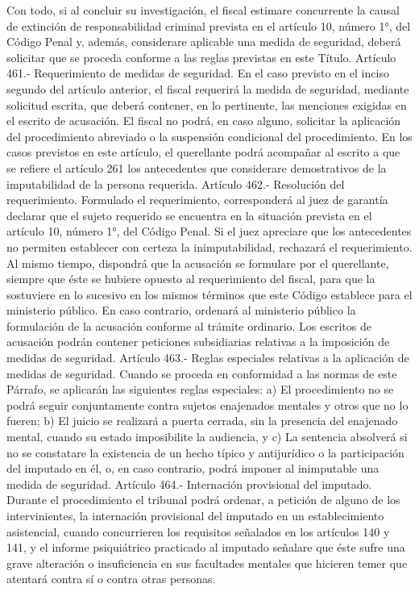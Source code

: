     Con todo, si al concluir su investigación, el fiscal estimare concurrente la causal de extinción de responsabilidad criminal prevista en el artículo 10, número 1°, del Código Penal y, además, considerare aplicable una medida de seguridad, deberá solicitar que se proceda conforme a las reglas previstas en este Título.
    Artículo 461.- Requerimiento de medidas de seguridad. En el caso previsto en el inciso segundo del artículo anterior, el fiscal requerirá la medida de seguridad, mediante solicitud escrita, que deberá contener, en lo pertinente, las menciones exigidas en el escrito de acusación.
    El fiscal no podrá, en caso alguno, solicitar la aplicación del procedimiento abreviado o la suspensión condicional del procedimiento.
    En los casos previstos en este artículo, el querellante podrá acompañar al escrito a que se refiere el artículo 261 los antecedentes que considerare demostrativos de la imputabilidad de la persona requerida.
    Artículo 462.- Resolución del requerimiento. Formulado el requerimiento, corresponderá al juez de garantía declarar que el sujeto requerido se encuentra en la situación prevista en el artículo 10, número 1°, del Código Penal. Si el juez apreciare que los antecedentes no permiten establecer con certeza la inimputabilidad, rechazará el requerimiento.
    Al mismo tiempo, dispondrá que la acusación se formulare por el querellante, siempre que éste se hubiere opuesto al requerimiento del fiscal, para que la sostuviere en lo sucesivo en los mismos términos que este Código establece para el ministerio público. En caso contrario, ordenará al ministerio público la formulación de la acusación conforme al trámite ordinario.
    Los escritos de acusación podrán contener peticiones subsidiarias relativas a la imposición de medidas de seguridad.
    Artículo 463.- Reglas especiales relativas a la aplicación de medidas de seguridad. Cuando se proceda en conformidad a las normas de este Párrafo, se aplicarán las siguientes reglas especiales:
    a) El procedimiento no se podrá seguir conjuntamente contra sujetos enajenados mentales y otros que no lo fueren;
    b) El juicio se realizará a puerta cerrada, sin la presencia del enajenado mental, cuando su estado imposibilite la audiencia, y
    c) La sentencia absolverá si no se constatare la existencia de un hecho típico y antijurídico o la participación del imputado en él, o, en caso contrario, podrá imponer al inimputable una medida de seguridad.
    Artículo 464.- Internación provisional del imputado. Durante el procedimiento el tribunal podrá ordenar, a petición de alguno de los intervinientes, la internación provisional del imputado en un establecimiento asistencial, cuando concurrieren los requisitos señalados en los artículos 140 y 141, y el informe psiquiátrico practicado al imputado señalare que éste sufre una grave alteración o insuficiencia en sus facultades mentales que hicieren temer que atentará contra sí o contra otras personas.
